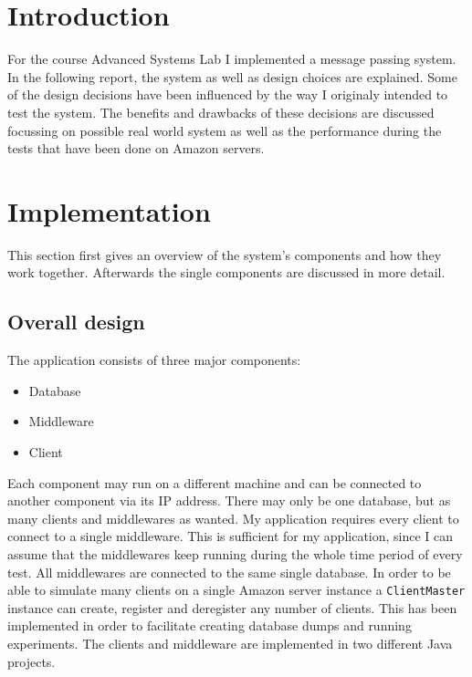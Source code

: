 \documentclass[
10pt, %
a4paper, %
oneside, %
headinclude,footinclude, %
BCOR5mm, %
]{scrartcl}
\begin{document}

\newpage %

\section{Introduction}
For the course Advanced Systems Lab I implemented a message passing system. In the following report, the system as well as design choices are explained. Some of the design decisions have been influenced by the way I originaly intended to test the system. The benefits and drawbacks of these decisions are discussed focussing on possible real world system as well as the performance during the tests that have been done on Amazon servers.



\section{Implementation}
This section first gives an overview of the system's components and how they work together. Afterwards the single components are discussed in more detail. 

\subsection{Overall design}
The application consists of three major components:
\begin{itemize}
	\item Database
	\item Middleware
	\item Client
\end{itemize}

Each component may run on a different machine and can be connected to another component via its IP address. There may only be one database, but as many clients and middlewares as wanted. My application requires every client to connect to a single middleware. This is sufficient for my application, since I can assume that the middlewares keep running during the whole time period of every test. All middlewares are connected to the same single database. In order to be able to simulate many clients on a single Amazon server instance a \texttt{ClientMaster} instance can create, register and deregister any number of clients. This has been implemented in order to facilitate creating database dumps and running experiments. The clients and middleware are implemented in two different Java projects. 
\end{document}
